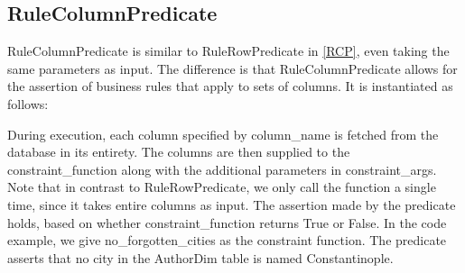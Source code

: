 \subsection{RuleColumnPredicate}
RuleColumnPredicate is similar to RuleRowPredicate in \cref{RCP}, even taking the same parameters as input. The difference is that RuleColumnPredicate allows for the assertion of business rules that apply to sets of columns. It is instantiated as follows:


During execution, each column specified by column\_name is fetched from the database in its entirety. The columns are then supplied to the constraint\_function along with the additional parameters in constraint\_args. Note that in contrast to RuleRowPredicate, we only call the function a single time, since it takes entire columns as input. The assertion made by the predicate holds, based on whether constraint\_function returns True or False.
In the code example, we give no\_forgotten\_cities as the constraint function. The predicate asserts that no city in the AuthorDim table is named Constantinople.